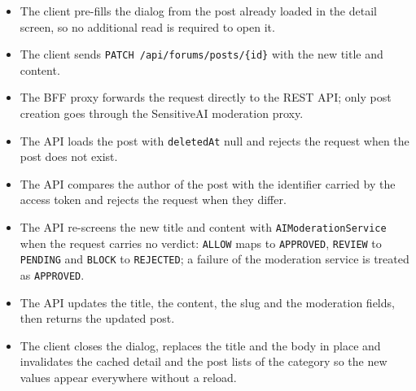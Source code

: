 \begin{itemize}[leftmargin=1.6em,topsep=3pt,itemsep=2pt,parsep=0pt,label=$\bullet$]
      \item The client pre-fills the dialog from the post already loaded in the detail
            screen, so no additional read is required to open it.
      \item The client sends \texttt{PATCH /api/forums/posts/\{id\}} with the new title and
            content.
      \item The BFF proxy forwards the request directly to the REST API; only post creation
            goes through the SensitiveAI moderation proxy.
      \item The API loads the post with \texttt{deletedAt} null and rejects the request
            when the post does not exist.
      \item The API compares the author of the post with the identifier carried by the
            access token and rejects the request when they differ.
      \item The API re-screens the new title and content with \texttt{AIModerationService}
            when the request carries no verdict: \texttt{ALLOW} maps to \texttt{APPROVED},
            \texttt{REVIEW} to \texttt{PENDING} and \texttt{BLOCK} to \texttt{REJECTED}; a
            failure of the moderation service is treated as \texttt{APPROVED}.
      \item The API updates the title, the content, the slug and the moderation fields,
            then returns the updated post.
      \item The client closes the dialog, replaces the title and the body in place and
            invalidates the cached detail and the post lists of the category so the new
            values appear everywhere without a reload.
\end{itemize}

